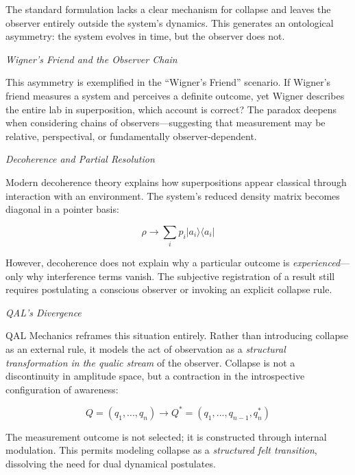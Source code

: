 \documentclass[11pt]{article}
\numberwithin{equation}{section} %
\begin{document}
The standard formulation lacks a clear mechanism for collapse and leaves the observer entirely outside the system’s dynamics. This generates an ontological asymmetry: the system evolves in time, but the observer does not.

\bigskip

\noindent \textit{Wigner’s Friend and the Observer Chain}

This asymmetry is exemplified in the “Wigner’s Friend” scenario. If Wigner’s friend measures a system and perceives a definite outcome, yet Wigner describes the entire lab in superposition, which account is correct? The paradox deepens when considering chains of observers—suggesting that measurement may be relative, perspectival, or fundamentally observer-dependent.

\bigskip

\noindent \textit{Decoherence and Partial Resolution}

Modern decoherence theory explains how superpositions appear classical through interaction with an environment. The system’s reduced density matrix becomes diagonal in a pointer basis:

\begin{equation}
\rho \rightarrow \sum_i p_i |a_i\rangle \langle a_i|
\end{equation}

However, decoherence does not explain why a particular outcome is \textit{experienced}—only why interference terms vanish. The subjective registration of a result still requires postulating a conscious observer or invoking an explicit collapse rule.

\bigskip

\noindent \textit{QAL’s Divergence}

QAL Mechanics reframes this situation entirely. Rather than introducing collapse as an external rule, it models the act of observation as a \textit{structural transformation in the qualic stream} of the observer. Collapse is not a discontinuity in amplitude space, but a contraction in the introspective configuration of awareness:

\begin{equation}
Q = (q_1, ..., q_n) \rightarrow Q^* = (q_1, ..., q_{n-1}, q_n^*)
\end{equation}

The measurement outcome is not selected; it is constructed through internal modulation. This permits modeling collapse as a \textit{structured felt transition}, dissolving the need for dual dynamical postulates.
\end{document}
